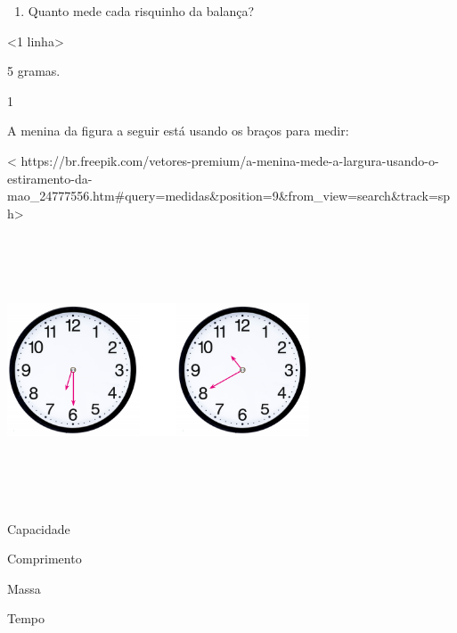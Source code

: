 {\begin{enumerate}
\def\labelenumi{\alph{enumi})}
\item
  Quanto mede cada risquinho da balança?
\end{enumerate}

\textless{}1 linha\textgreater{}

5 gramas.


\num{1}

A menina da figura a seguir está usando os braços para medir:

\textless{}
https://br.freepik.com/vetores-premium/a-menina-mede-a-largura-usando-o-estiramento-da-mao\_24777556.htm\#query=medidas\&position=9\&from\_view=search\&track=sph\textgreater{}

\includegraphics[width=3.53125in,height=3.14257in]{media/image55.png}

\begin{escolha}
\item Capacidade

\item Comprimento

\item Massa

\item Tempo
\end{escolha}

}
